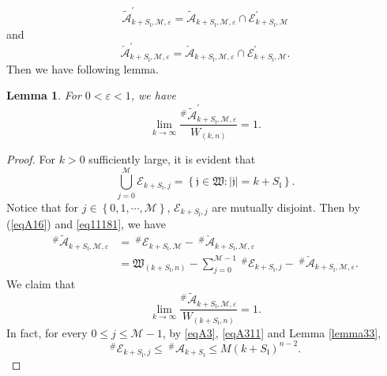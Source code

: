 \documentclass[11pt]{article}
\theoremstyle{plain}
\newtheorem{lem}[thm]{Lemma}
\theoremstyle{definition}
\begin{document}
{\begin{equation}\label{eq316}
\tilde{\mathcal{A}}_{k+S_\mathfrak{l},\mathscr{M},\varepsilon }^{\prime} =
\tilde{\mathcal{A}}_{k+S_\mathfrak{l},\mathscr{M},\varepsilon } \cap \mathcal{E}_{k+S_\mathfrak{l},\mathscr{M} }^{\prime}
\end{equation}
and $$\check{\mathcal{A}}^{\prime}_{k+S_\mathfrak{l},\mathscr{M},\varepsilon }=\check{\mathcal{A}}_{k+S_\mathfrak{l},\mathscr{M},\varepsilon } \cap \mathcal{E}_{k+S_\mathfrak{l},\mathscr{M} }^{\prime}.$$
Then we have following lemma.
\begin{lem}\label{lemA2.7}
For $0 < \varepsilon < 1$, we have
	$$ \lim\limits_{k\to \infty}\frac{^{\#  } \tilde{\mathcal{A}}_{k+S_\mathfrak{l},\mathscr{M},\varepsilon }^{\prime} }{W_{(k,n)} }= 1.$$
\end{lem}
\begin{proof}
 For $k > 0$ sufficiently large,
 it is evident that
\begin{equation}\label{eq11181}
\bigcup_{j=0}^{\mathscr{M} }  \mathcal{E}_{k+S_\mathfrak{l} ,j}  =\left \{ \mathfrak{j} \in \mathfrak{W} : \left | \mathfrak{j}\right |=k+S_\mathfrak{l}   \right \}.
\end{equation}
	Notice that for $j\in \left \{ 0,1,\cdots,\mathscr{M} \right \} $, $\mathcal{E}_{k+S_\mathfrak{l}, j}$ are mutually disjoint. Then by (\ref{eqA16}) and \eqref{eq11181}, we have
	\begin{equation}\label{eq319}
		\begin{aligned}
			^{\#  } \tilde{\mathcal{A}}_{k+S_\mathfrak{l},\mathscr{M},\varepsilon }
			  &= \ ^{\#  }\mathcal{E}_{k+S_\mathfrak{l},\mathscr{M}}   - \ ^{\#  } \check{\mathcal{A}}_{k+S_\mathfrak{l},\mathscr{M},\varepsilon }
			\\&=   \mathfrak{W}_{(k+S_\mathfrak{l},n)}- \sum\limits_{j=0}^{\mathscr{M}-1}\  ^{\#  }\mathcal{E}_{k+S_\mathfrak{l},j} - \ ^{\#  } \check{\mathcal{A}}_{k+S_\mathfrak{l},\mathscr{M},\varepsilon }.
		\end{aligned}
	\end{equation}
	We claim that
	\begin{equation} \label{xianzai1}\lim\limits_{k\to \infty} \frac{^{\#  } \tilde{\mathcal{A}}_{k+S_{\mathfrak{l}},\mathscr{M},\varepsilon }  }{W_{(k+S_{\mathfrak{l}},n)}}=1.\end{equation} 
	In fact, for
	every $0 \le j \le \mathscr{M}-1$, by \eqref{eqA3}, \eqref{eqA311} and Lemma \ref{lemma33}, \begin{equation} \label{eqwkn111}^{\#  } \mathcal{E}_{k+S_\mathfrak{l},j}   \le \ ^{\#  } \mathcal{A}_{k+S_\mathfrak{l}} \le M\left ( k+S_\mathfrak{l}\right ) ^{n-2}.\end{equation}

\end{proof}}
\end{document}
